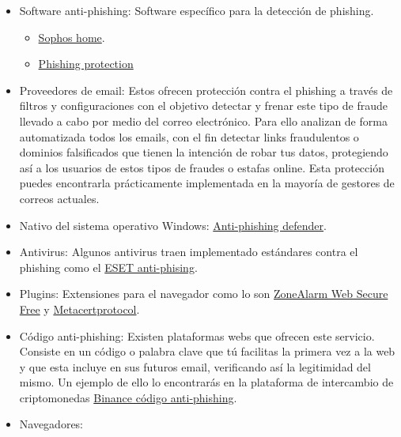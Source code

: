 \documentclass[
  spanish,
  a4paper,
  openany]{book}
\begin{document}
\begin{itemize}
\item
  Software anti-phishing: Software específico para la detección de phishing.

  \begin{itemize}
  \item
    \href{https://home.sophos.com/es-es.aspx}{Sophos home}.
  \item
    \href{https://www.phishprotection.com/}{Phishing protection}
  \end{itemize}
\item
  Proveedores de email: Estos ofrecen protección contra el phishing a través de filtros y configuraciones con el objetivo detectar y frenar este tipo de fraude llevado a cabo por medio del correo electrónico. Para ello analizan de forma automatizada todos los emails, con el fin detectar links fraudulentos o dominios falsificados que tienen la intención de robar tus datos, protegiendo así a los usuarios de estos tipos de fraudes o estafas online. Esta protección puedes encontrarla prácticamente implementada en la mayoría de gestores de correos actuales.
\item
  Nativo del sistema operativo Windows: \href{https://docs.microsoft.com/es-es/office365/servicedescriptions/office-365-advanced-threat-protection-service-description}{Anti-phishing defender}.
\item
  Antivirus: Algunos antivirus traen implementado estándares contra el phishing como el \href{https://support.eset.com/es/kb6380-activar-anti-phishing-en-productos-para-android-de-eset\#enable}{ESET anti-phising}.
\item
  Plugins: Extensiones para el navegador como lo son \href{https://www.zonealarm.com/es/software/web-secure-free}{ZoneAlarm Web Secure Free} y \href{https://metacertprotocol.com/cryptonite}{Metacertprotocol}.
\item
  Código anti-phishing: Existen plataformas webs que ofrecen este servicio. Consiste en un código o palabra clave que tú facilitas la primera vez a la web y que esta incluye en sus futuros email, verificando así la legitimidad del mismo. Un ejemplo de ello lo encontrarás en la plataforma de intercambio de criptomonedas \href{https://academy.binance.com/es/articles/anti-phishing-code}{Binance código anti-phishing}.
\item
  Navegadores:


\end{itemize}
\end{document}
